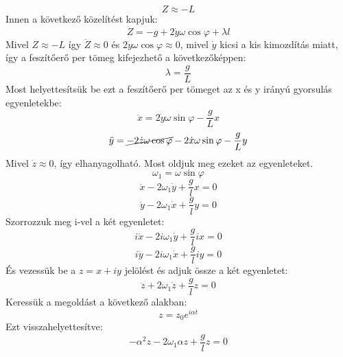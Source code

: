 \documentclass[../main.tex]{subfiles}
\begin{document}
\begin{equation}
    Z \approx -L
\end{equation}
Innen a következő közelítést kapjuk:
\begin{equation}
    \ddot{Z} = -g + 2\dot{y}\omega\cos\varphi + \lambda l
\end{equation}
Mivel $Z \approx -L$ így $\ddot{Z} \approx 0$ és $2\dot{y}\omega\cos\varphi \approx 0$, mivel $\dot{y}$ kicsi a kis kimozdítás miatt, így a feszítőerő per tömeg kifejezhető a következőképpen:
\begin{equation}
    \lambda = \frac{g}{L}
\end{equation}
Most helyettesítsük be ezt a feszítőerő per tömeget az x és y irányú gyorsulás egyenletekbe:
\begin{equation}
    \ddot{x} = 2\dot{y}\omega\sin\varphi - \frac{g}{L}x
\end{equation}
\begin{equation}
    \ddot{y} = \cancel{-2\dot{z}\omega\cos\varphi} - 2\dot{x}\omega\sin\varphi - \frac{g}{L}y
\end{equation}
Mivel $\dot{z} \approx 0$, így elhanyagolható. Most oldjuk meg ezeket az egyenleteket. 
\begin{equation}
    \omega_1 = \omega \sin \varphi
\end{equation}
\begin{equation}
    \ddot{x} - 2 \omega_1 \dot{y} + \frac{g}{l} x = 0
\end{equation}
\begin{equation}
    \ddot{y} - 2 \omega_1 \dot{x} + \frac{g}{l} y = 0
\end{equation}
Szorrozzuk meg i-vel a két egyenletet:
\begin{equation}
   i \ddot{x} - 2i \omega_1 \dot{y} + \frac{g}{l} ix = 0
\end{equation}
\begin{equation}
   i \ddot{y} - 2i \omega_1 \dot{x} + \frac{g}{l} iy = 0
\end{equation}
És vezessük be a $z = x + iy$ jelölést és adjuk össze a két egyenletet:
\begin{equation}
    \ddot{z} + 2 \omega_1 \dot{z} + \frac{g}{l} z = 0
\end{equation}
Keressük a megoldást a következő alakban:
\begin{equation}
    z = z_0 e^{i  \alpha t}
\end{equation}
Ezt visszahelyettesítve:
\begin{equation}
    - \alpha^2 z - 2 \omega_1 \alpha z + \frac{g}{l} z = 0
\end{equation}
\end{document}

